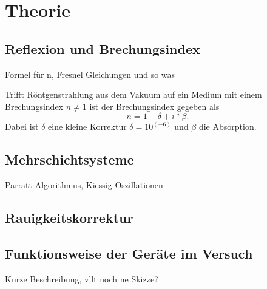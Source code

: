 \section{Theorie}
\label{sec:Theorie}

\subsection{Reflexion und Brechungsindex}
\label{theo1}

Formel für n, Fresnel Gleichungen und so was

Trifft Röntgenstrahlung aus dem Vakuum auf ein Medium mit einem Brechungsindex $n \neq 1$ ist der Brechungsindex gegeben als
\begin{equation}
    n = 1 −  \delta + i * \beta.
    \label{eq:index}
\end{equation}
Dabei ist $\delta$ eine kleine Korrektur $\delta = 10^(-6)$ und $\beta$ die Absorption.



\subsection{Mehrschichtsysteme}
\label{theo2}

Parratt-Algorithmus, Kiessig Oszillationen 

\subsection{Rauigkeitskorrektur}
\label{theo3}

\subsection{Funktionsweise der Geräte im Versuch}
\label{theo4}
 
Kurze Beschreibung, vllt noch ne Skizze?